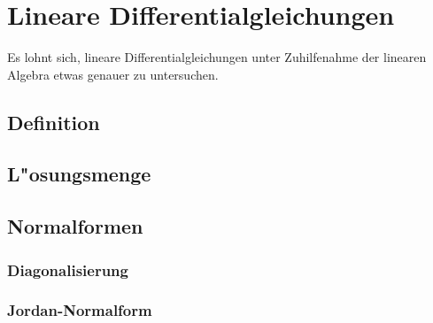 %
%
%
\chapter{Lineare Differentialgleichungen\label{chapter:linear}}
\lhead{}
Es lohnt sich, lineare Differentialgleichungen unter Zuhilfenahme
der linearen Algebra etwas genauer zu untersuchen.
\section{Definition}
\section{L"osungsmenge}
\section{Normalformen}
\subsection{Diagonalisierung}
\subsection{Jordan-Normalform}

